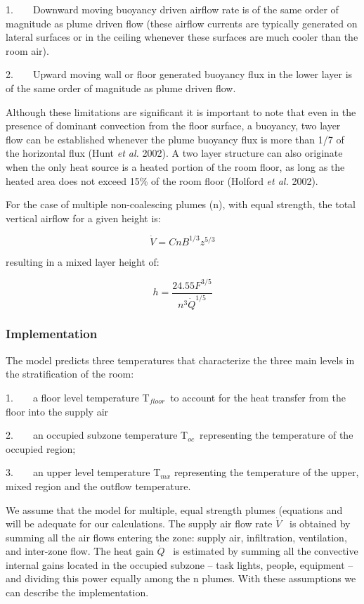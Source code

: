 1.~~~~Downward moving buoyancy driven airflow rate is of the same order of magnitude as plume driven flow (these airflow currents are typically generated on lateral surfaces or in the ceiling whenever these surfaces are much cooler than the room air).

2.~~~~Upward moving wall or floor generated buoyancy flux in the lower layer is of the same order of magnitude as plume driven flow.

Although these limitations are significant it is important to note that even in the presence of dominant convection from the floor surface, a buoyancy, two layer flow can be established whenever the plume buoyancy flux is more than 1/7 of the horizontal flux (Hunt \emph{et al.} 2002). A two layer structure can also originate when the only heat source is a heated portion of the room floor, as long as the heated area does not exceed 15\% of the room floor (Holford \emph{et al.} 2002).

For the case of multiple non-coalescing plumes (n), with equal strength, the total vertical airflow for a given height is:

\begin{equation}
  \dot{V} = CnB^{1/3}z^{5/3}
\end{equation}

resulting in a mixed layer height of:

\begin{equation}
  h = \frac{24.55F^{3/5}}{{n^3 \dot{Q}}^{1/5}}
\end{equation}

\subsubsection{Implementation}\label{implementation}

The model predicts three temperatures that characterize the three main levels in the stratification of the room:

1.~~~~a floor level temperature T\(_{floor}\)~to account for the heat transfer from the floor into the supply air

2.~~~~an occupied subzone temperature T\(_{oc}\)~representing the temperature of the occupied region;

3.~~~~an upper level temperature T\(_{mx}\) representing the temperature of the upper, mixed region and the outflow temperature.

We assume that the model for multiple, equal strength plumes (equations and will be adequate for our calculations. The supply air flow rate \(\dot V\) ~is obtained by summing all the air flows entering the zone: supply air, infiltration, ventilation, and inter-zone flow. The heat gain \(\dot Q\) ~is estimated by summing all the convective internal gains located in the occupied subzone -- task lights, people, equipment -- and dividing this power equally among the n plumes. With these assumptions we can describe the implementation.


